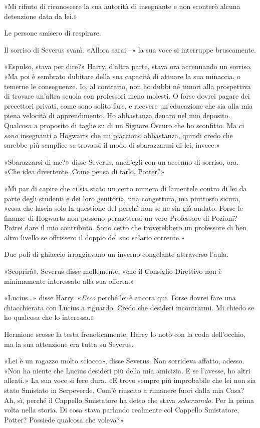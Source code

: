 «Mi rifiuto di riconoscere la sua autorità di insegnante e non sconterò alcuna detenzione data da lei.»

Le persone smisero di respirare.

Il sorriso di Severus svanì. «Allora sarai –» la sua voce si interruppe bruscamente.

«Espulso, stava per dire?» Harry, d’altra parte, stava ora accennando un sorriso. «Ma poi è sembrato dubitare della sua capacità di attuare la sua minaccia, o temerne le conseguenze. Io, al contrario, non ho dubbi né timori alla prospettiva di trovare un’altra scuola con professori meno molesti. O forse dovrei pagare dei precettori privati, come sono solito fare, e ricevere un’educazione che sia alla mia piena velocità di apprendimento. Ho abbastanza denaro nel mio deposito. Qualcosa a proposito di taglie su di un Signore Oscuro che ho sconfitto. Ma ci \textit{sono} insegnanti a Hogwarts che mi piacciono abbastanza, quindi credo che sarebbe più semplice se trovassi il modo di sbarazzarmi di lei, invece.»

«Sbarazzarsi di me?» disse Severus, anch’egli con un accenno di sorriso, ora. «Che idea divertente. Come pensa di farlo, Potter?»

«Mi par di capire che ci sia stato un certo numero di lamentele contro di lei da parte degli studenti e dei loro genitori», una congettura, ma piuttosto sicura, «cosa che lascia solo la questione del perché non se ne sia già andato. Forse le finanze di Hogwarts non possono permettersi un vero Professore di Pozioni? Potrei dare il mio contributo. Sono certo che troverebbero un professore di ben altro livello se offrissero il doppio del suo salario corrente.»

Due poli di ghiaccio irraggiavano un inverno congelante attraverso l’aula.

«Scoprirà», Severus disse mollemente, «che il Consiglio Direttivo non è minimamente interessato alla sua offerta.»

«Lucius…» disse Harry. «\textit{Ecco} perché lei è ancora qui. Forse dovrei fare una chiacchierata con Lucius a riguardo. Credo che desideri incontrarmi. Mi chiedo se ho qualcosa che lo interessa.»

Hermione scosse la testa freneticamente. Harry lo notò con la coda dell’occhio, ma la sua attenzione era tutta su Severus.

«Lei è un ragazzo molto sciocco», disse Severus. Non sorrideva affatto, adesso. «Non ha niente che Lucius desideri più della mia amicizia. E se l’avesse, ho altri alleati.» La sua voce si fece dura. «E trovo sempre più improbabile che lei non sia stato Smistato in Serpeverde. Com’è riuscito a rimanere fuori dalla mia Casa? Ah, sì, perché il Cappello Smistatore ha detto che stava \textit{scherzando}. Per la prima volta nella storia. Di cosa stava parlando realmente col Cappello Smistatore, Potter? Possiede qualcosa che voleva?»

